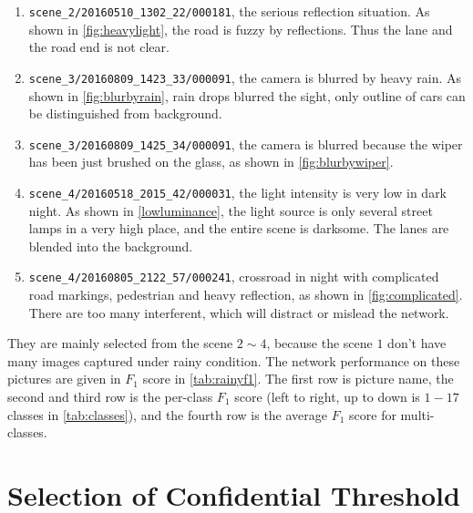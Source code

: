 \begin{spacing}{1.5}
\begin{enumerate}
    \item \texttt{scene\_2/20160510\_1302\_22/000181}, the serious reflection situation. As shown in \autoref{fig:heavylight}, the road is fuzzy by reflections. Thus the lane and the road end is not clear.
    \item \texttt{scene\_3/20160809\_1423\_33/000091}, the camera is blurred by heavy rain. As shown in \autoref{fig:blurbyrain}, rain drops blurred the sight, only outline of cars can be distinguished from background.
    \item \texttt{scene\_3/20160809\_1425\_34/000091}, the camera is blurred because the wiper has been just brushed on the glass, as shown in \autoref{fig:blurbywiper}.
    \item \texttt{scene\_4/20160518\_2015\_42/000031}, the light intensity is very low in dark night. As shown in \autoref{lowluminance}, the light source is only several street lamps in a very high place, and the entire scene is darksome. The lanes are blended into the background.
    \item \texttt{scene\_4/20160805\_2122\_57/000241}, crossroad in night with complicated road markings, pedestrian and heavy reflection, as shown in \autoref{fig:complicated}. There are too many interferent, which will distract or mislead the network.
\end{enumerate}

They are mainly selected from the scene $2 \sim 4$, because the scene $1$ don't have many images captured under rainy condition. The network performance on these pictures are given in $F_1$ score in \autoref{tab:rainyf1}. The first row is picture name, the second and third row is the per-class $F_1$ score (left to right, up to down is $1-17$ classes in \autoref{tab:classes}), and the fourth row is the average $F_1$ score for multi-classes.


\section{Selection of Confidential Threshold}
\label{sec:EX_threshold}


\end{spacing}
